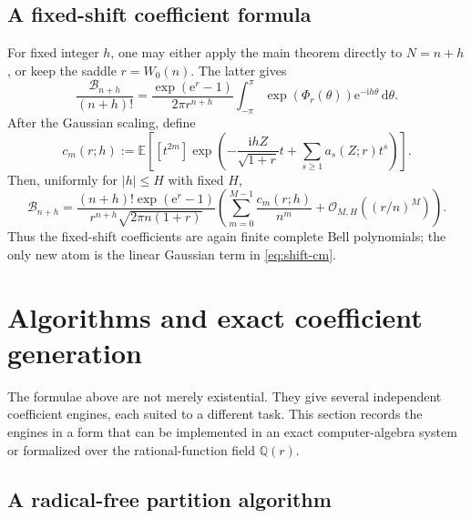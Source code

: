 \documentclass[11pt,a4paper]{article}
\theoremstyle{definition}
\theoremstyle{remark}
\newcommand{\Bell}{\mathcal B}
\newcommand{\E}{\mathbb E}
\newcommand{\Q}{\mathbb Q}
\newcommand{\ii}{\mathrm i}
\newcommand{\ee}{\mathrm e}
\newcommand{\dd}{\,\mathrm d}
\newcommand{\BigO}{\mathcal O}
\newcommand{\coef}[2]{[#1^{#2}]}
\begin{document}
\subsection{A fixed-shift coefficient formula}

For fixed integer \(h\), one may either apply the main theorem directly to
\(N=n+h\), or keep the saddle \(r=W_0(n)\).  The latter gives
\begin{equation}\label{eq:shift-integral}
 \frac{\Bell_{n+h}}{(n+h)!}
 =\frac{\exp(\ee^r-1)}{2\pi r^{n+h}}
  \int_{-\pi}^{\pi}\exp(\Phi_r(\theta))\ee^{-\ii h\theta}\dd\theta.
\end{equation}
After the Gaussian scaling, define
\begin{equation}\label{eq:shift-cm}
 c_m(r;h):=
 \E\!\left[
  \coef{t}{2m}
  \exp\!\left(
   -\frac{\ii hZ}{\sqrt{1+r}}t
   +\sum_{s\ge1}a_s(Z;r)t^s
  \right)
 \right].
\end{equation}
Then, uniformly for \(|h|\le H\) with fixed \(H\),
\begin{equation}\label{eq:shift-expansion}
 \Bell_{n+h}=
 \frac{(n+h)!\exp(\ee^r-1)}{r^{n+h}\sqrt{2\pi n(1+r)}}
 \left(
   \sum_{m=0}^{M-1}\frac{c_m(r;h)}{n^m}
   +\BigO_{M,H}((r/n)^M)
 \right).
\end{equation}
Thus the fixed-shift coefficients are again finite complete Bell polynomials;
the only new atom is the linear Gaussian term in \cref{eq:shift-cm}.

\section{Algorithms and exact coefficient generation}\label{sec:algorithm}

The formulae above are not merely existential.  They give several independent
coefficient engines, each suited to a different task.  This section records the
engines in a form that can be implemented in an exact computer-algebra system
or formalized over the rational-function field \(\Q(r)\).

\subsection{A radical-free partition algorithm}
\end{document}
